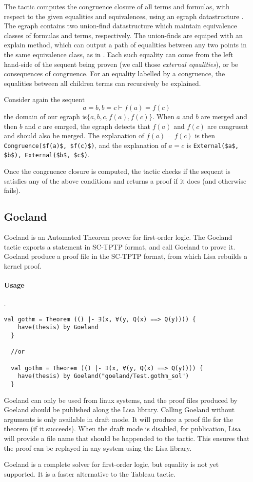 The tactic computes the congruence closure of all terms and formulas, with respect to the given equalities and equivalences, using an egraph datastructure \cite{willseyEggFastExtensible2021, nelsonFastDecisionProcedures1980}. The egraph contains two union-find datastructure which maintain equivalence classes of formulas and terms, respectively. The union-finds are equiped with an explain method, which can output a path of equalities between any two points in the same equivalence class, as in \cite{nelsonFastDecisionProcedures1980}. Each such equality can come from the left hand-side of the sequent being proven (we call those \textit{external equalities}), or be consequences of congruence. For an equality labelled by a congruence, the equalities between all children terms can recursively be explained.

\begin{example}
  Consider again the sequent
  $$
  a = b, b = c \vdash f(a) = f(c)
  $$
  the domain of our egraph is$\lbrace a, b, c, f(a), f(c) \rbrace$. When $a$ and $b$ are merged and then $b$ and $c$ are emrged, the egraph detects that $f(a)$ and $f(c)$ are congruent and should also be merged. The explanation of $f(a) = f(c)$ is then \lstinline|Congruence($f(a)$, $f(c)$)|, and the explanation of $a = c$ is \lstinline|External($a$, $b$), External($b$, $c$)|.
\end{example}

Once the congruence closure is computed, the tactic checks if the sequent is satisfies any of the above conditions and returns a proof if it does (and otherwise fails).

\subsection*{Goeland}
Goeland\cite{DBLP:conf/cade/CaillerRDRB22} is an Automated Theorem prover for first-order logic. The Goeland tactic exports a statement in SC-TPTP format, and call Goeland to prove it. Goeland produce a proof file in the SC-TPTP format, from which Lisa rebuilds a kernel proof.
\paragraph*{Usage}.
\newline\begin{lstlisting}[language=lisa, frame=single]
  val gothm = Theorem (() |- ∃(x, ∀(y, Q(x) ==> Q(y)))) {
    have(thesis) by Goeland
  }

  //or

  val gothm = Theorem (() |- ∃(x, ∀(y, Q(x) ==> Q(y)))) {
    have(thesis) by Goeland("goeland/Test.gothm_sol")
  }
\end{lstlisting}
Goeland can only be used from linux systems, and the proof files produced by Goeland should be published along the Lisa library. Calling Goeland without arguments is only available in draft mode. It will produce a proof file for the theorem (if it succeeds). When the draft mode is disabled, for publication, Lisa will provide a file name that should be happended to the tactic. This ensures that the proof can be replayed in any system using the Lisa library.

Goeland is a complete solver for first-order logic, but equality is not yet supported. It is a faster alternative to the Tableau tactic.